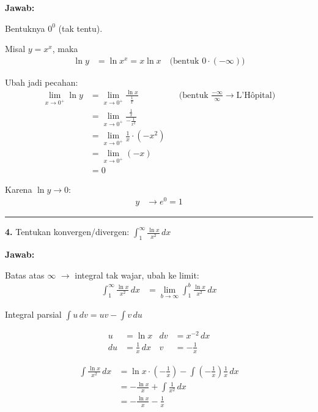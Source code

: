 \documentclass{article}
\begin{document}
\medskip
\textbf{Jawab:}

Bentuknya $0^0$ (tak tentu).

Misal $y = x^x$, maka
\begin{align*}
  \ln y &= \ln x^x = x \ln x \quad \text{(bentuk } 0 \cdot (-\infty)\text{)}
\end{align*}

Ubah jadi pecahan:
\begin{align*}
  \lim_{x \to 0^+} \ln y
    &= \lim_{x \to 0^+} \frac{\ln x}{\frac{1}{x}}
       && \text{(bentuk } \tfrac{-\infty}{\infty} \rightarrow \text{L'H\^opital)} \\[6pt]
    &= \lim_{x \to 0^+} \frac{\frac{1}{x}}{-\frac{1}{x^2}} \\[6pt]
    &= \lim_{x \to 0^+} \frac{1}{x} \cdot \left(-x^2\right) \\[6pt]
    &= \lim_{x \to 0^+} (-x) \\[6pt]
    &= 0
\end{align*}

Karena $\ln y \to 0$:
\begin{align*}
  y &\to e^0 = 1
\end{align*}


\bigskip\hrule\bigskip

\textbf{4.} Tentukan konvergen/divergen: $\displaystyle \int_1^{\infty} \frac{\ln x}{x^2}\, dx$

\medskip
\textbf{Jawab:}

Batas atas $\infty$ $\rightarrow$ integral tak wajar, ubah ke limit:
\begin{align*}
  \int_1^{\infty} \frac{\ln x}{x^2}\, dx &= \lim_{b \to \infty} \int_1^{b} \frac{\ln x}{x^2}\, dx
\end{align*}

Integral parsial $\displaystyle \int u \, dv = uv - \int v \, du$

\begin{align*}
  u  &= \ln x    & dv &= x^{-2}\, dx \\
  du &= \frac{1}{x}\, dx & v &= -\frac{1}{x}
\end{align*}

\begin{align*}
  \int \frac{\ln x}{x^2}\, dx
    &= \ln x \cdot \left(-\frac{1}{x}\right) - \int \left(-\frac{1}{x}\right)\frac{1}{x}\, dx \\[6pt]
    &= -\frac{\ln x}{x} + \int \frac{1}{x^2}\, dx \\[6pt]
    &= -\frac{\ln x}{x} - \frac{1}{x}
\end{align*}
\end{document}
